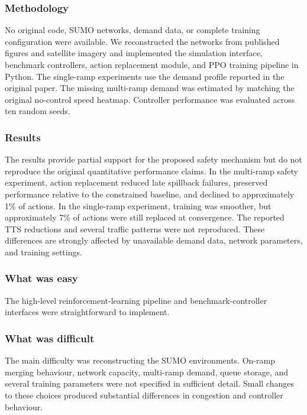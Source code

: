 \subsubsection{Methodology}

No original code, SUMO networks, demand data, or complete training configuration were available. We reconstructed the networks from published figures and satellite imagery and implemented the simulation interface, benchmark controllers, action replacement module, and PPO training pipeline in Python. The single-ramp experiments use the demand profile reported in the original paper. The missing multi-ramp demand was estimated by matching the original no-control speed heatmap. Controller performance was evaluated across ten random seeds.


\subsubsection{Results}

The results provide partial support for the proposed safety mechanism but do not reproduce the original quantitative performance claims. In the multi-ramp safety experiment, action replacement reduced late spillback failures, preserved performance relative to the constrained baseline, and declined to approximately 1\% of actions. In the single-ramp experiment, training was smoother, but approximately 7\% of actions were still replaced at convergence. The reported TTS reductions and several traffic patterns were not reproduced. These differences are strongly affected by unavailable demand data, network parameters, and training settings.


\subsubsection{What was easy}

The high-level reinforcement-learning pipeline and benchmark-controller interfaces were straightforward to implement.


\subsubsection{What was difficult}

The main difficulty was reconstructing the SUMO environments. On-ramp merging behaviour, network capacity, multi-ramp demand, queue storage, and several training parameters were not specified in sufficient detail. Small changes to these choices produced substantial differences in congestion and controller behaviour.


